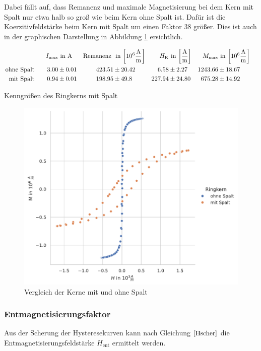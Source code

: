 \documentclass[12pt,a4paper]{scrartcl}
\numberwithin{equation}{section} %
\renewcommand{\[}{} %
\renewcommand{\]}{\noindent} %
\begin{document}
Dabei fällt auf, dass Remanenz und maximale Magnetisierung bei dem Kern mit Spalt nur etwa halb so groß wie beim Kern ohne Spalt ist. Dafür ist die Koerzitivfeldstärke beim Kern mit Spalt um einen Faktor \(38\) größer. Dies ist auch in der graphischen Darstellung in Abbildung \ref{Abb: Vergleich} ersichtlich.

\begin{table}
\begin{align*}
	I_\mathrm{max} &\text{ in } \mathrm A &
	\text{Remanenz } &\text{ in }
	{\tiny \left[10^6 \frac{\mathrm A}{\mathrm m} \right] } &
	H_\mathrm{K} &\text{ in }
	{\tiny \left[ \frac{\mathrm A}{\mathrm m} \right] } &
	M_\mathrm{max} &\text{ in }
	{\tiny \left[10^6 \frac{\mathrm A}{\mathrm m} \right] }
	\\
	\text{ohne Spalt}\qquad
	3.00 &\pm 0.01 &
	423.51 &\pm 20.42 &
	6.58 &\pm 2.27 &
	1243.66 &\pm 18.67
	\\
	\text{mit Spalt}\qquad
	0.94 &\pm 0.01 &
	198.95 &\pm 49.8 &
	227.94 &\pm 24.80 &
	675.28 &\pm 14.92 &
\end{align*}
\caption{Kenngrößen des Ringkerns mit Spalt}
\label{Tab: kenngr Spalt}
\end{table}

\begin{figure}
\centering
\includegraphics[scale=0.6]{../media/B2.4/3.3.3_comparison.pdf}
\caption{Vergleich der Kerne mit und ohne Spalt}
\label{Abb: Vergleich}
\end{figure}

\hypertarget{entmagnetisierungsfaktor-2}{%
\subsubsection{Entmagnetisierungsfaktor}\label{entmagnetisierungsfaktor-2}}
Aus der Scherung der Hysteresekurven kann nach Gleichung \(\eqref{Hscher}\) die Entmagnetisierungsfeldstärke \(H_\mathrm{ent}\) ermittelt werden.
\end{document}

